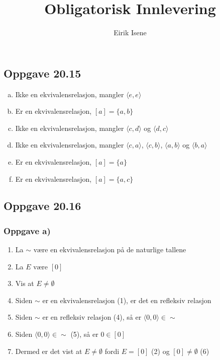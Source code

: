\documentclass[norsk, 12p]{article}
\title{Obligatorisk Innlevering}
\author{Eirik Isene}
\begin{document}
\maketitle

\subsection{Oppgave 20.15}
\begin{enumerate}[a)]
    \item Ikke en ekvivalensrelasjon, mangler $\langle e,e\rangle$
    \item Er en ekvivalensrelasjon, $[a] = \{a,b\}$
    \item Ikke en ekvivalensrelasjon, mangler $\langle c,d\rangle$ og $\langle d,c\rangle$
    \item Ikke en ekvivalensrelasjon, mangler $\langle c,a\rangle$, $\langle c,b\rangle$, $\langle a,b\rangle$ og $\langle b,a\rangle$
    \item Er en ekvivalensrelasjon, $[a] = \{a\}$
    \item Er en ekvivalensrelasjon, $[a] = \{a,c\}$
\end{enumerate}

\subsection{Oppgave 20.16}
\subsubsection{Oppgave a)} 
\begin{enumerate}   
    \item La $\sim$ være en ekvivalensrelasjon på de naturlige tallene
    \item La $E$ være $[0]$
    \item Vis at $E \neq \emptyset$
    \item Siden $\sim$ er en ekvivalensrelasjon (1), er det en refleksiv relasjon
    \item Siden $\sim$ er en refleksiv relasjon (4), så er $\langle 0,0\rangle \in \sim$
    \item Siden $\langle 0,0\rangle \in \sim$ (5), så er $0 \in [0]$
    \item Dermed er det vist at $E \neq \emptyset$ fordi $E = [0]$ (2) og $[0] \neq \emptyset$ (6) 
\end{enumerate}
\end{document}
